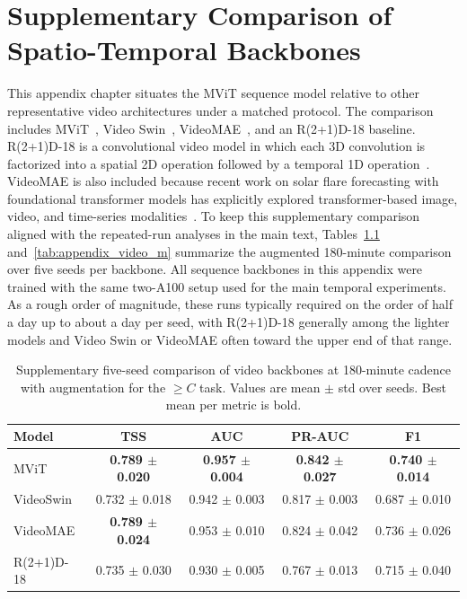 \FloatBarrier

\chapter{Supplementary Comparison of Spatio-Temporal Backbones}
\label{app:video_backbone_comparison}

This appendix chapter situates the MViT sequence model relative to other representative video architectures under a matched protocol. The comparison includes MViT~\cite{ref_mvit,ref_mvitv2}, Video Swin~\cite{ref_video_swin}, VideoMAE~\cite{ref_videomae}, and an R(2+1)D-18 baseline. R(2+1)D-18 is a convolutional video model in which each 3D convolution is factorized into a spatial 2D operation followed by a temporal 1D operation~\cite{ref_r2plus1d}. VideoMAE is also included because recent work on solar flare forecasting with foundational transformer models has explicitly explored transformer-based image, video, and time-series modalities~\cite{ref_riggi_transformers}. To keep this supplementary comparison aligned with the repeated-run analyses in the main text, Tables~\ref{tab:appendix_video_c} and~\ref{tab:appendix_video_m} summarize the augmented 180-minute comparison over five seeds per backbone. All sequence backbones in this appendix were trained with the same two-A100 setup used for the main temporal experiments. As a rough order of magnitude, these runs typically required on the order of half a day up to about a day per seed, with R(2+1)D-18 generally among the lighter models and Video Swin or VideoMAE often toward the upper end of that range.

\begin{table}[!htbp]
\centering
\footnotesize
\caption{Supplementary five-seed comparison of video backbones at 180-minute cadence with augmentation for the $\geq C$ task. Values are mean $\pm$ std over seeds. Best mean per metric is bold.}
\label{tab:appendix_video_c}
\begin{tabular}{lcccc}
\toprule
Model & TSS & AUC & PR-AUC & F1 \\
\midrule
MViT & \textbf{0.789 $\pm$ 0.020} & \textbf{0.957 $\pm$ 0.004} & \textbf{0.842 $\pm$ 0.027} & \textbf{0.740 $\pm$ 0.014} \\
VideoSwin & 0.732 $\pm$ 0.018 & 0.942 $\pm$ 0.003 & 0.817 $\pm$ 0.003 & 0.687 $\pm$ 0.010 \\
VideoMAE & \textbf{0.789 $\pm$ 0.024} & 0.953 $\pm$ 0.010 & 0.824 $\pm$ 0.042 & 0.736 $\pm$ 0.026 \\
R(2+1)D-18 & 0.735 $\pm$ 0.030 & 0.930 $\pm$ 0.005 & 0.767 $\pm$ 0.013 & 0.715 $\pm$ 0.040 \\
\bottomrule
\end{tabular}
\end{table}

